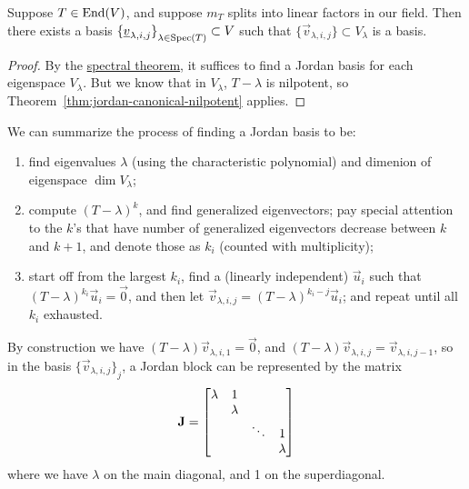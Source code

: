 \begin{theorem}\label{thm:jordan-canonical-form}
    Suppose \(T \in \operatorname{End}(V)\),
    and suppose \(m_T\) splits into linear factors in our field.
    Then there exists a basis \({\{\underline{v}_{\lambda,i,j}\}}_{\lambda\in\operatorname{Spec}(T)} \subset V\)
    such that \(\{\vec{v}_{\lambda,i,j}\} \subset V_\lambda\) is a basis.
\end{theorem}
\begin{proof}
    By the \hyperref[thm:spectral]{spectral theorem},
    it suffices to find a Jordan basis for each eigenspace \(V_\lambda\).
    But we know that in \(V_\lambda\), \(T-\lambda\) is nilpotent,
    so Theorem~\ref{thm:jordan-canonical-nilpotent} applies.
\end{proof}
\begin{remark}
    We can summarize the process of finding a Jordan basis to be:
    \begin{enumerate}[label={(\arabic*)}, itemsep=0mm]
        \item find eigenvalues \(\lambda\) (using the characteristic polynomial)
            and dimenion of eigenspace \(\dim V_\lambda\);
        \item compute \({(T-\lambda)}^k\), and find generalized eigenvectors;
            pay special attention to the \(k\)'s
            that have number of generalized eigenvectors decrease between \(k\) and \(k+1\),
            and denote those as \(k_i\) (counted with multiplicity);
        \item start off from the largest \(k_i\),
            find a (linearly independent) \(\vec{u}_i\)
            such that \({(T-\lambda)}^{k_i}\vec{u}_i = \vec{0}\),
            and then let \(\vec{v}_{\lambda,i,j} = {(T-\lambda)}^{k_i-j}\vec{u}_i\);
            and repeat until all \(k_i\) exhausted.
    \end{enumerate}
    By construction we have \((T-\lambda)\vec{v}_{\lambda,i,1} = \vec{0}\),
    and \((T-\lambda)\vec{v}_{\lambda,i,j} = \vec{v}_{\lambda,i,j-1}\),
    so in the basis \({\{\vec{v}_{\lambda,i,j}\}}_j\),
    a Jordan block can be represented by the matrix
    \begin{equation*}
        \vb{J} =
        \begin{bmatrix}
            \lambda & 1 \\
            & \lambda \\
            & & \ddots & 1 \\
            & & & \lambda
        \end{bmatrix}
    \end{equation*}
    where we have \(\lambda\) on the main diagonal,
    and 1 on the superdiagonal.
\end{remark}
